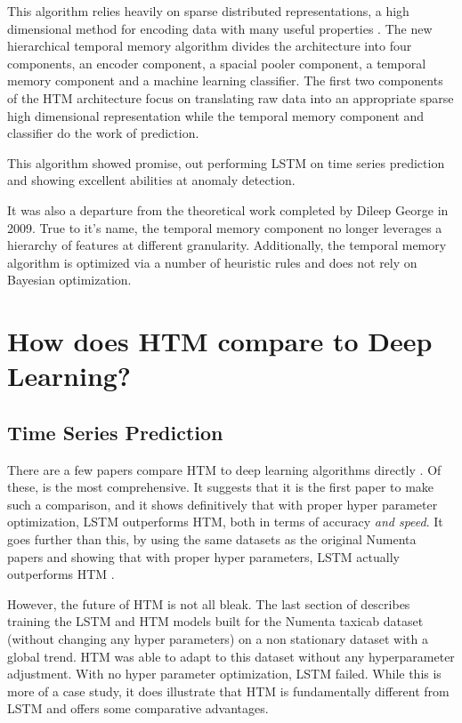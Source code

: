 \documentclass{article}
\begin{document}
This algorithm relies heavily on sparse distributed representations, a high dimensional method for encoding data with many useful properties \cite{Kanerva2009}. The new hierarchical temporal memory algorithm divides the architecture into four components, an encoder component, a spacial pooler component, a temporal memory component and a machine learning classifier. The first two components of the HTM architecture focus on translating raw data into an appropriate sparse high dimensional representation while the temporal memory component and classifier do the work of prediction.

This algorithm showed promise, out performing LSTM on time series prediction and showing excellent abilities at anomaly detection.

It was also a departure from the theoretical work completed by Dileep George in 2009. True to it's name, the temporal memory component no longer leverages a hierarchy of features at different granularity. Additionally, the temporal memory algorithm is optimized via a number of heuristic rules and does not rely on Bayesian optimization. 

\section*{How does HTM compare to Deep Learning?}

\subsection*{Time Series Prediction}
There are a few papers compare HTM to deep learning algorithms directly \cite{Struye2020, Mackenzie2019, Cui2016, Cui2016b}. Of these, \cite{Struye2020} is the most comprehensive. It suggests that it is the first paper to make such a comparison, and it shows definitively that with proper hyper parameter optimization, LSTM outperforms HTM, both in terms of accuracy \textit{and speed}. It goes further than this, by using the same datasets as the original Numenta papers and showing that with proper hyper parameters, LSTM actually outperforms HTM \cite{Cui2016, Cui2016b}.

However, the future of HTM is not all bleak. The last section of \cite{Struye2020} describes training the LSTM and HTM models built for the Numenta taxicab dataset (without changing any hyper parameters) on a non stationary dataset with a global trend. HTM was able to adapt to this dataset without any hyperparameter adjustment. With no hyper parameter optimization, LSTM failed. While this is more of a case study, it does illustrate that HTM is fundamentally different from LSTM and offers some comparative advantages.
\end{document}
